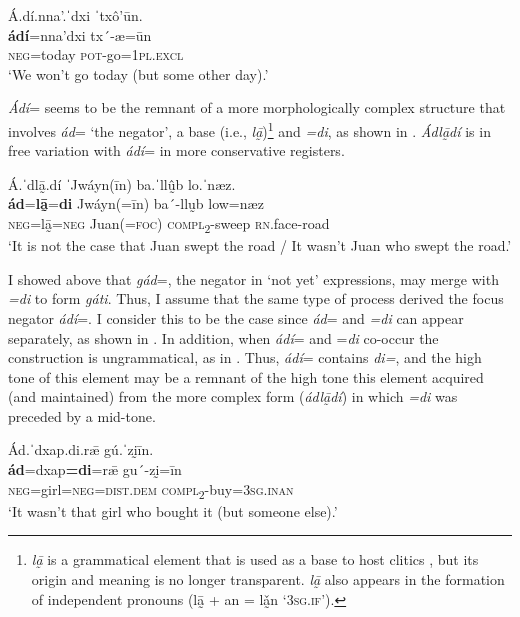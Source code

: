 \documentclass[output=paper,colorlinks=true, citecolor=brown]{langscibook}
\begin{document}
\ea\label{ex:zap:74} 
    \glll Á.dí.nna’.ˈdxi ˈtxô’ūn.\\ 
          \textbf{ádí}=nna’dxi tx´-æ=ūn\\
          \textsc{neg}=today \textsc{pot}{}-go=\textsc{1pl.excl}\\
    \glt ‘We won’t go today (but some other day).’
\z 

\textit{Ádí}= seems to be the remnant of a more morphologically complex structure that involves \textit{ád}= ‘the negator’, a base (i.e., \textit{lā̰})\footnote{\textit{lā̰} is a grammatical element that is used as a base to host clitics \citep{Foreman2006}, but its origin and meaning is no longer transparent. \textit{lā̰} also appears in the formation of independent pronouns (lā̰ + an = lǎ̰n ‘\textsc{3sg.if}’).} and \textit{=di}, as shown in . \textit{Ádlā̰dí} is in free variation with \textit{ádí}= in more conservative registers.

\ea\label{ex:zap:75} 
    \glll Á.ˈdlā̰.dí ˈJwáyn(īn) ba.ˈllṵ̂b lo.ˈnæz.\\ 
          \textbf{ád}=\textbf{lā̰}=\textbf{di} Jwáyn(=īn) ba´-llṵb low=næz\\
          \textsc{neg}=lā̰=\textsc{neg} Juan(=\textsc{foc}) \textsc{compl}\textsc{\textsubscript{2}}{}-sweep \textsc{rn}.face-road\\
    \glt ‘It is not the case that Juan swept the road / It wasn’t Juan who swept the road.’
\z 

I showed above that \textit{gád}=, the negator in ‘not yet’ expressions, may merge with \textit{=di} to form \textit{gáti}. Thus, I assume that the same type of process derived the focus negator \textit{ádí}=. I consider this to be the case since \textit{ád}= and \textit{=di} can appear separately, as shown in . In addition, when \textit{ádí}= and =\textit{di} co-occur the construction is ungrammatical, as in . Thus, \textit{ádí}= contains \textit{di=}, and the high tone of this element may be a remnant of the high tone this element acquired (and maintained) from the more complex form (\textit{ádlā̰dí}) in which \textit{=di} was preceded by a mid-tone.

\ea\label{ex:zap:76} 
    \glll Ád.ˈdxap.di.rǣ gú.ˈzḭīn.\\ 
          \textbf{ád}=dxap\textbf{=di}=rǣ gu´-zḭ=īn\\
          \textsc{neg}=girl=\textsc{neg}=\textsc{dist.dem} \textsc{compl}\textsc{\textsubscript{2}}{}-buy=\textsc{3sg.inan}\\
    \glt ‘It wasn’t that girl who bought it (but someone else).’
\z 
\end{document}
